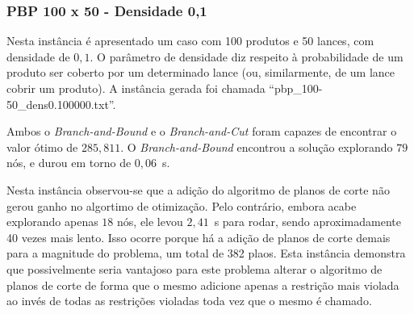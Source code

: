 \documentclass{article}
\begin{document}
    
    
    \subsubsection{PBP 100 x 50 - Densidade 0,1}
    
    Nesta instância é apresentado um caso com 100 produtos e 50 lances, com densidade de $0{,}1$. O parâmetro de densidade diz respeito à probabilidade de um produto ser coberto por um determinado lance (ou, similarmente, de um lance cobrir um produto). A instância gerada foi chamada \enquote{pbp\_100-50\_dens0.100000.txt}.
    
    Ambos o \emph{Branch-and-Bound} e o \emph{Branch-and-Cut} foram capazes de encontrar o valor ótimo de $285{,}811$. O \emph{Branch-and-Bound} encontrou a solução explorando $79$ nós, e durou em torno de $0{,}06$~s. 
    
    Nesta instância observou-se que a adição do algoritmo de planos de corte não gerou ganho no algortimo de otimização. Pelo contrário, embora acabe explorando apenas $18$ nós, ele levou $2{,}41$~s para rodar, sendo aproximadamente 40 vezes mais lento. Isso ocorre porque há a adição de planos de corte demais para a magnitude do problema, um total de 382 plaos. Esta instância demonstra que possivelmente seria vantajoso para este problema alterar o algoritmo de planos de corte de forma que o mesmo adicione apenas a restrição mais violada ao invés de todas as restrições violadas toda vez que o mesmo é chamado.
    
    
    
\end{document}
